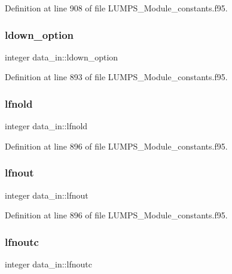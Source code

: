 Definition at line 908 of file L\+U\+M\+P\+S\+\_\+\+Module\+\_\+constants.\+f95.

\mbox{\label{namespacedata__in_a7ee5c5c530300f6627f86b6cbde2d5b9}} 
\subsubsection{\texorpdfstring{ldown\+\_\+option}{ldown\_option}}
{\footnotesize\ttfamily integer data\+\_\+in\+::ldown\+\_\+option}



Definition at line 893 of file L\+U\+M\+P\+S\+\_\+\+Module\+\_\+constants.\+f95.

\mbox{\label{namespacedata__in_a3b953424146f8076e9fec820cd6f31d2}} 
\subsubsection{\texorpdfstring{lfnold}{lfnold}}
{\footnotesize\ttfamily integer data\+\_\+in\+::lfnold}



Definition at line 896 of file L\+U\+M\+P\+S\+\_\+\+Module\+\_\+constants.\+f95.

\mbox{\label{namespacedata__in_ad453037bad2cda84e61ec000bdd004aa}} 
\subsubsection{\texorpdfstring{lfnout}{lfnout}}
{\footnotesize\ttfamily integer data\+\_\+in\+::lfnout}



Definition at line 896 of file L\+U\+M\+P\+S\+\_\+\+Module\+\_\+constants.\+f95.

\mbox{\label{namespacedata__in_a0189adce2d060aee708a9216b5c771e2}} 
\subsubsection{\texorpdfstring{lfnoutc}{lfnoutc}}
{\footnotesize\ttfamily integer data\+\_\+in\+::lfnoutc}



